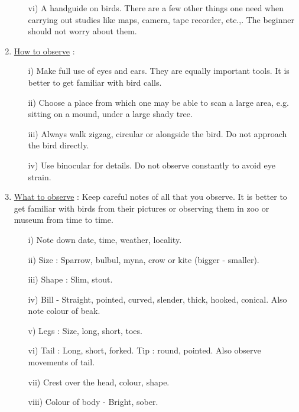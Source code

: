 \begin{enumerate}
\begin{itemize}
\item[vi)] A handguide on birds. There are a few other things one 
need when carrying out studies like maps, camera, tape 
recorder, etc.,. The beginner should not worry about 
them. 
\end{itemize}

\item \underline{How to observe} :
\begin{itemize}
\item[i)] Make full use of eyes and ears. They are equally important 
tools. It is better to get familiar with bird calls. 

\item[ii)] Choose a place from which one may be able to scan a 
large area, e.g. sitting on a mound, under a large 
shady tree. 

\item[iii)] Always walk zigzag, circular or alongside the bird. Do 
not approach the bird directly. 

\item[iv)] Use binocular for details. Do not observe constantly to 
avoid eye strain. 
\end{itemize}

\item \underline{What to observe} : Keep careful notes of all that you observe. 
It is better to get familiar with birds from their 
pictures or observing them in zoo or museum from time to 
time. 
\begin{itemize}
\item[i)] Note down date, time, weather, locality. 

\item[ii)] Size  : Sparrow, bulbul, myna, crow or kite 
(bigger - smaller). 

\item[iii)] Shape : Slim, stout. 

\item[iv)] Bill - Straight, pointed, curved, slender, thick, 
hooked, conical. Also note colour of beak.

\item[v)] Legs : Size, long, short, toes. 

\item[vi)] Tail : Long, short, forked. Tip : round, pointed. Also 
observe movements of tail. 

\item[vii)] Crest over the head, colour, shape. 

\item[viii)] Colour of body - Bright, sober. 


\end{itemize}
\end{enumerate}
